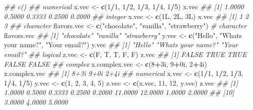 \documentclass[
]{book}
\newenvironment{Shaded}{\begin{snugshade}}{\end{snugshade}}
\newcommand{\CommentTok}[1]{\textcolor[rgb]{0.56,0.35,0.01}{\textit{#1}}}
\newcommand{\DecValTok}[1]{\textcolor[rgb]{0.00,0.00,0.81}{#1}}
\newcommand{\KeywordTok}[1]{\textcolor[rgb]{0.13,0.29,0.53}{\textbf{#1}}}
\newcommand{\NormalTok}[1]{#1}
\newcommand{\OperatorTok}[1]{\textcolor[rgb]{0.81,0.36,0.00}{\textbf{#1}}}
\newcommand{\StringTok}[1]{\textcolor[rgb]{0.31,0.60,0.02}{#1}}
\begin{document}
\begin{Shaded}
\begin{Highlighting}[]
\CommentTok{\#\# c()}
\CommentTok{\#\# numerical}
\NormalTok{x.vec \textless{}{-}}\StringTok{ }\KeywordTok{c}\NormalTok{(}\DecValTok{1}\OperatorTok{/}\DecValTok{1}\NormalTok{, }\DecValTok{1}\OperatorTok{/}\DecValTok{2}\NormalTok{, }\DecValTok{1}\OperatorTok{/}\DecValTok{3}\NormalTok{, }\DecValTok{1}\OperatorTok{/}\DecValTok{4}\NormalTok{, }\DecValTok{1}\OperatorTok{/}\DecValTok{5}\NormalTok{)}
\NormalTok{x.vec}
\CommentTok{\#\# [1] 1.0000 0.5000 0.3333 0.2500 0.2000}
\CommentTok{\#\# integer}
\NormalTok{x.vec \textless{}{-}}\StringTok{ }\KeywordTok{c}\NormalTok{(1L, 2L, 3L)}
\NormalTok{x.vec}
\CommentTok{\#\# [1] 1 2 3}
\CommentTok{\#\# character}
\NormalTok{flavors.vec \textless{}{-}}\StringTok{ }\KeywordTok{c}\NormalTok{(}\StringTok{"chocolate"}\NormalTok{, }\StringTok{"vanilla"}\NormalTok{, }\StringTok{"strawberry"}\NormalTok{) }\CommentTok{\# character}
\NormalTok{flavors.vec}
\CommentTok{\#\# [1] "chocolate"  "vanilla"    "strawberry"}
\NormalTok{y.vec \textless{}{-}}\StringTok{ }\KeywordTok{c}\NormalTok{(}\StringTok{"Hello"}\NormalTok{, }\StringTok{"What\textquotesingle{}s your name?"}\NormalTok{, }\StringTok{"Your email?"}\NormalTok{)}
\NormalTok{y.vec}
\CommentTok{\#\# [1] "Hello"             "What\textquotesingle{}s your name?" "Your email?"}
\CommentTok{\#\# logical}
\NormalTok{z.vec \textless{}{-}}\StringTok{ }\KeywordTok{c}\NormalTok{(F, T, T, F, F)}
\NormalTok{z.vec}
\CommentTok{\#\# [1] FALSE  TRUE  TRUE FALSE FALSE}
\CommentTok{\#\# complex}
\NormalTok{x.complex.vec \textless{}{-}}\StringTok{ }\KeywordTok{c}\NormalTok{(}\DecValTok{8}\OperatorTok{+}\NormalTok{3i, }\DecValTok{9}\OperatorTok{+}\NormalTok{0i, }\DecValTok{2}\OperatorTok{+}\NormalTok{4i)}
\NormalTok{x.complex.vec}
\CommentTok{\#\# [1] 8+3i 9+0i 2+4i}
\CommentTok{\#\# numerical}
\NormalTok{x.vec \textless{}{-}}\StringTok{ }\KeywordTok{c}\NormalTok{(}\DecValTok{1}\OperatorTok{/}\DecValTok{1}\NormalTok{, }\DecValTok{1}\OperatorTok{/}\DecValTok{2}\NormalTok{, }\DecValTok{1}\OperatorTok{/}\DecValTok{3}\NormalTok{, }\DecValTok{1}\OperatorTok{/}\DecValTok{4}\NormalTok{, }\DecValTok{1}\OperatorTok{/}\DecValTok{5}\NormalTok{)}
\NormalTok{y.vec \textless{}{-}}\StringTok{ }\KeywordTok{c}\NormalTok{(}\DecValTok{1}\NormalTok{, }\DecValTok{2}\NormalTok{, }\DecValTok{3}\NormalTok{, }\DecValTok{4}\NormalTok{, }\DecValTok{5}\NormalTok{)}
\NormalTok{z.vec \textless{}{-}}\StringTok{ }\KeywordTok{c}\NormalTok{(x.vec, }\DecValTok{11}\NormalTok{, }\DecValTok{12}\NormalTok{, y.vec)}
\NormalTok{z.vec}
\CommentTok{\#\#  [1]  1.0000  0.5000  0.3333  0.2500  0.2000 11.0000 12.0000  1.0000  2.0000}
\CommentTok{\#\# [10]  3.0000  4.0000  5.0000}
\end{Highlighting}
\end{Shaded}
\end{document}
